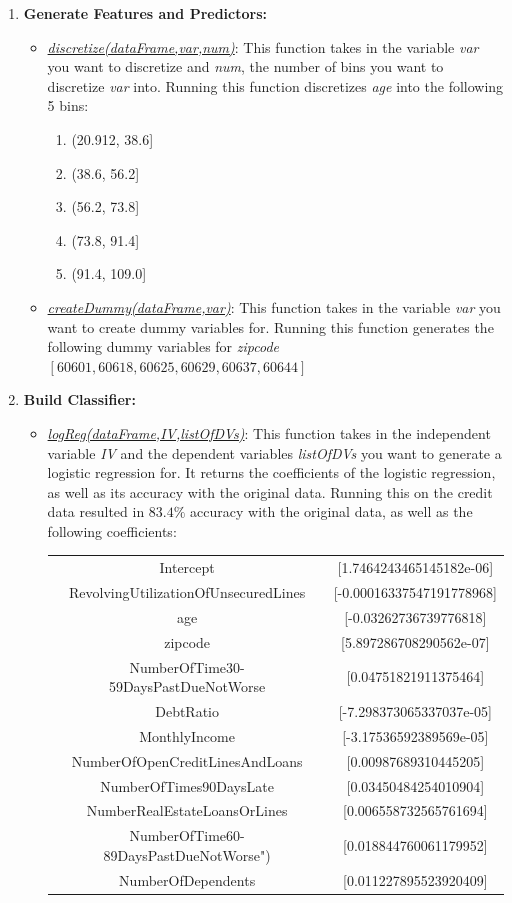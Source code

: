 \documentclass[letterpaper,12pt]{article}
\begin{document}
\begin{enumerate}
\item \textbf{Generate Features and Predictors:}
\begin{itemize}
\item \underline{\textit{discretize(dataFrame,var,num)}}: This function takes in the variable \textit{var} you want to discretize and \textit{num}, the number of bins you want to discretize \textit{var} into. Running this function discretizes \textit{age} into the following 5 bins: 
\begin{enumerate}
\item (20.912, 38.6]
\item (38.6, 56.2] 
\item (56.2, 73.8] 
\item (73.8, 91.4]
\item (91.4, 109.0]
\end{enumerate}
\item \underline{\textit{createDummy(dataFrame,var)}}: This function takes in the variable \textit{var} you want to create dummy variables for. Running this function generates the following dummy variables for \textit{zipcode} $[60601,60618,60625,60629,60637,60644]$
\end{itemize}

\newpage

\item \textbf{Build Classifier:}
\begin{itemize}
\item \underline{\textit{logReg(dataFrame,IV,listOfDVs)}}: This function takes in the independent variable \textit{IV} and the dependent variables \textit{listOfDVs} you want to generate a logistic regression for. It returns the coefficients of the logistic regression, as well as its accuracy with the original data. Running this on the credit data resulted in $83.4\%$ accuracy with the original data, as well as the following coefficients: \\
\begin{tabular}{c c}
Intercept & [1.7464243465145182e-06]\\
RevolvingUtilizationOfUnsecuredLines & [-0.00016337547191778968] \\
age & [-0.03262736739776818] \\
zipcode & [5.897286708290562e-07] \\
NumberOfTime30-59DaysPastDueNotWorse & [0.04751821911375464] \\
DebtRatio & [-7.298373065337037e-05] \\
MonthlyIncome & [-3.17536592389569e-05] \\
NumberOfOpenCreditLinesAndLoans & [0.00987689310445205] \\
NumberOfTimes90DaysLate & [0.03450484254010904] \\
NumberRealEstateLoansOrLines & [0.006558732565761694] \\
NumberOfTime60-89DaysPastDueNotWorse") & [0.018844760061179952] \\
NumberOfDependents & [0.011227895523920409] \\
\end{tabular} \\
\end{itemize}



\end{enumerate}
\end{document}
